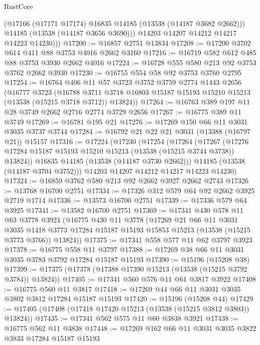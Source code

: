 \begin{lexlean}{RustCore}
\begin{coremodule}
            (@17166 (@17171 @17174) @16835 @14185 (@13538 (@14187 @3682 @2662)))
            @14185
            (@13538 (@14187 @3656 @3690)))
          @14203
          @14207
          @14212
          @14217
          @14223
          @14230)))
@17200 := @16857 @2751 @13834
@17208 := @17200 @3702 @614 @411 @88 @3753 @4016 @2662 @3160
@17216 := @16719 @582 @612 @485 @88 @3753 @3930 @2662 @4016
@17224 := @16728 @555 @580 @213 @92 @3753 @3762 @2662 @3930
@17230 := @16755 @554 @58 @92 @3753 @3760 @2795
@17254 := @16764
    @406
    @11
    @57
    @3723
    @3752
    @3759
    @2774
    @1443
    @2656
    (@16777
      @3723
      (@16788 @3711 @3718 @16803 @15187 @15193 @15210 @15213 (@13538 (@15215 @3718 @3712)) @13824))
@17264 := @16763 @389 @197 @11 @28 @3749 @2662 @2716 @2774 @3729 @2656
@17267 := @16775 @389 @11 @3749
@17269 := @16781 @195 @21
@17276 := @17269 @150 @66 @11 @3031 @3035 @3737 @3744
@17284 := @16792 @21 @22 @21 @3031 (@13388 (@16797 @21)) @15157
@17316 := @17224
    (@17230
      (@17254
        (@17264
          (@17267 (@17276 @17284 @15187 @15193 @15210 @15213 (@13538 (@15215 @3744 @3738)) @13824))
          @16835
          @14185
          (@13538 (@14187 @3730 @2662)))
        @14185
        (@13538 (@14187 @3704 @3752)))
      @14203
      @14207
      @14212
      @14217
      @14223
      @14230)
@17324 := @16859 @3762 @580 @213 @92 @2662 @3927 @2662 @2743
@17326 := @13768 @16700 @2751
@17334 := @17326 @312 @579 @64 @92 @2662 @3925 @2719 @1714
@17336 := @13573 @16700 @2751
@17339 := @17336 @579 @64 @3925
@17341 := @13582 @16700 @2751
@17369 := @17341
    @430
    @578
    @11
    @63
    @3778
    @3924
    (@16775
      @430
      @11
      @3778
      (@17269
        @21
        @66
        @11
        @3031
        @3035
        @1418
        @3773
        @17284
        @15187
        @15193
        @15853
        @15213
        (@13538 (@15215 @3773 @3766))
        @13824))
@17375 := @17341 @558 @577 @11 @62 @3797 @3923
@17378 := @16775 @558 @11 @3797
@17388 := @17269 @38 @66 @11 @3031 @3035 @3783 @3792 @17284 @15187 @15193
@17390 := @15196 (@15208 @38)
@17399 := @17375 (@17378 (@17388 @17390 @15213 (@13538 (@15215 @3792 @3784)) @13824))
@17405 := @17341 @560 @576 @11 @61 @3817 @3922
@17408 := @16775 @560 @11 @3817
@17418 := @17269 @44 @66 @11 @3031 @3035 @3802 @3812 @17284 @15187 @15193
@17420 := @15196 (@15208 @44)
@17429 := @17405 (@17408 (@17418 @17420 @15213 (@13538 (@15215 @3812 @3803)) @13824))
@17435 := @17341 @562 @575 @11 @60 @3838 @3921
@17438 := @16775 @562 @11 @3838
@17448 := @17269 @162 @66 @11 @3031 @3035 @3822 @3833 @17284 @15187 @15193

\end{coremodule}
\end{lexlean}
